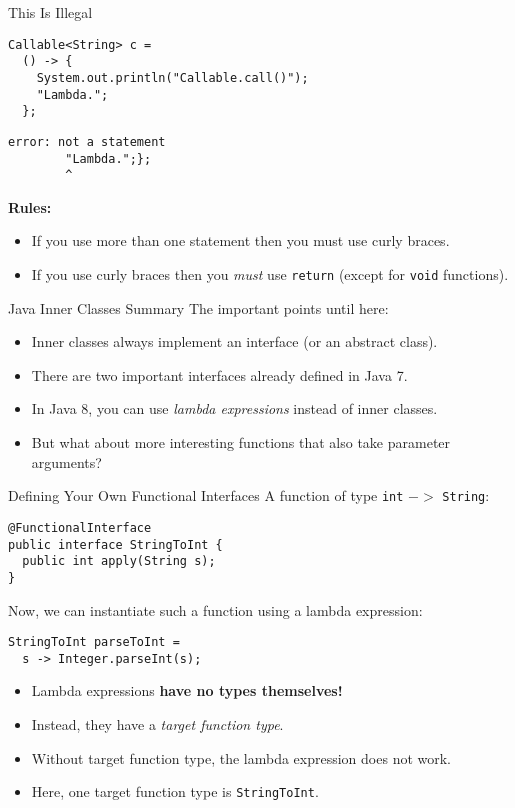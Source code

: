 \documentclass{beamer}
\begin{document}
\begin{frame}[fragile]{This Is Illegal}
\begin{lstlisting}
Callable<String> c =
  () -> {
    System.out.println("Callable.call()");
    "Lambda.";
  };
\end{lstlisting}

\pause{}

{\color{red!70!black}
\begin{verbatim}
error: not a statement
        "Lambda.";};
        ^
\end{verbatim}}

\pause{}

\textbf{Rules:}
\begin{itemize}
  \pause{} \item If you use more than one statement then you must use curly braces.
  \pause{} \item If you use curly braces then you \emph{must} use \lstinline{return} (except for \lstinline{void} functions).
\end{itemize}
\end{frame}

\begin{frame}{Java Inner Classes Summary}
The important points until here:

\begin{itemize}
\pause{} \item Inner classes always implement an interface (or an abstract class).
\pause{} \item There are two important interfaces already defined in Java 7.
\pause{} \item In Java 8, you can use \emph{lambda expressions} instead of inner classes.
\pause{} \item But what about more interesting functions that also take parameter arguments?
\end{itemize}
\end{frame}

\begin{frame}[fragile]{Defining Your Own Functional Interfaces}
A function of type \lstinline{int} $->$ \lstinline{String}:
\begin{lstlisting}
@FunctionalInterface
public interface StringToInt {
  public int apply(String s);
}
\end{lstlisting}

\pause{} Now, we can instantiate such a function using a lambda expression:
\begin{lstlisting}
StringToInt parseToInt =
  s -> Integer.parseInt(s);
\end{lstlisting}

\begin{itemize}
\pause{} \item Lambda expressions \textbf{have no types themselves!}
\pause{} \item Instead, they have a \emph{target function type}.
\pause{} \item Without target function type, the lambda expression does not work.
\pause{} \item Here, one target function type is \lstinline{StringToInt}.
\end{itemize}
\end{frame}
\end{document}
